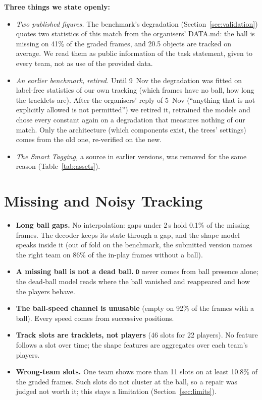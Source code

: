 \documentclass[conference,a4paper]{IEEEtran}
\newcommand{\code}[1]{\texttt{#1}}
\begin{document}
\textbf{Three things we state openly:}
\begin{itemize}
\item \emph{Two published figures.} The benchmark's degradation (Section~\ref{sec:validation}) quotes two
  statistics of this match from the organisers' DATA.md: the ball is missing on 41\% of the graded frames, and
  20.5 objects are tracked on average. We read them as public information of the task statement, given to every
  team, not as use of the provided data.
\item \emph{An earlier benchmark, retired.} Until 9~Nov the degradation was fitted on label-free statistics of our
  own tracking (which frames have no ball, how long the tracklets are). After the organisers' reply of 5~Nov
  (``anything that is not explicitly allowed is not permitted'') we retired it, retrained the models and chose
  every constant again on a degradation that measures nothing of our match. Only the architecture (which
  components exist, the trees' settings) comes from the old one, re-verified on the new.
\item \emph{The Smart Tagging,} a source in earlier versions, was removed for the same reason
  (Table~\ref{tab:assets}).
\end{itemize}

\section{Missing and Noisy Tracking}

\begin{itemize}
\item \textbf{Long ball gaps.} No interpolation: gaps under 2\,s hold 0.1\% of the missing frames. The decoder
  keeps its state through a gap, and the shape model speaks inside it (out of fold on the benchmark, the
  submitted version names the right team on 86\% of the in-play frames without a ball).
\item \textbf{A missing ball is not a dead ball.} \code{D} never comes from ball presence alone; the dead-ball model
  reads where the ball vanished and reappeared and how the players behave.
\item \textbf{The ball-speed channel is unusable} (empty on 92\% of the frames with a ball). Every speed comes
  from successive positions.
\item \textbf{Track slots are tracklets, not players} (46 slots for 22 players). No feature follows a slot over
  time; the shape features are aggregates over each team's players.
\item \textbf{Wrong-team slots.} One team shows more than 11 slots on at least 10.8\% of the graded frames. Such
  slots do not cluster at the ball, so a repair was judged not worth it; this stays a limitation
  (Section~\ref{sec:limits}).
\end{itemize}
\end{document}
